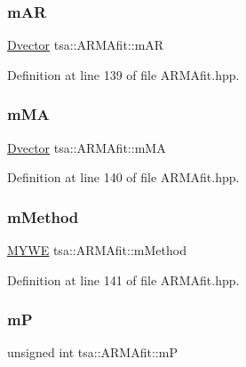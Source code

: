 \subsubsection{\texorpdfstring{m\+AR}{mAR}}
{\footnotesize\ttfamily \hyperlink{namespacetsa_a8900fb03d849baf447a1a0efe2561fb2}{Dvector} tsa\+::\+A\+R\+M\+Afit\+::m\+AR\hspace{0.3cm}{\ttfamily [private]}}



Definition at line 139 of file A\+R\+M\+Afit.\+hpp.

\mbox{\label{classtsa_1_1_a_r_m_afit_a3d7c0d01ce395406f72e6b17390a0a50}} 
\subsubsection{\texorpdfstring{m\+MA}{mMA}}
{\footnotesize\ttfamily \hyperlink{namespacetsa_a8900fb03d849baf447a1a0efe2561fb2}{Dvector} tsa\+::\+A\+R\+M\+Afit\+::m\+MA\hspace{0.3cm}{\ttfamily [private]}}



Definition at line 140 of file A\+R\+M\+Afit.\+hpp.

\mbox{\label{classtsa_1_1_a_r_m_afit_ae5d14a43af0447f8f64361e050631919}} 
\subsubsection{\texorpdfstring{m\+Method}{mMethod}}
{\footnotesize\ttfamily \hyperlink{classtsa_1_1_m_y_w_e}{M\+Y\+WE} tsa\+::\+A\+R\+M\+Afit\+::m\+Method\hspace{0.3cm}{\ttfamily [private]}}



Definition at line 141 of file A\+R\+M\+Afit.\+hpp.

\mbox{\label{classtsa_1_1_a_r_m_afit_a3662ce6508ec15a23142d30b44d08d8f}} 
\subsubsection{\texorpdfstring{mP}{mP}}
{\footnotesize\ttfamily unsigned int tsa\+::\+A\+R\+M\+Afit\+::mP\hspace{0.3cm}{\ttfamily [private]}}



